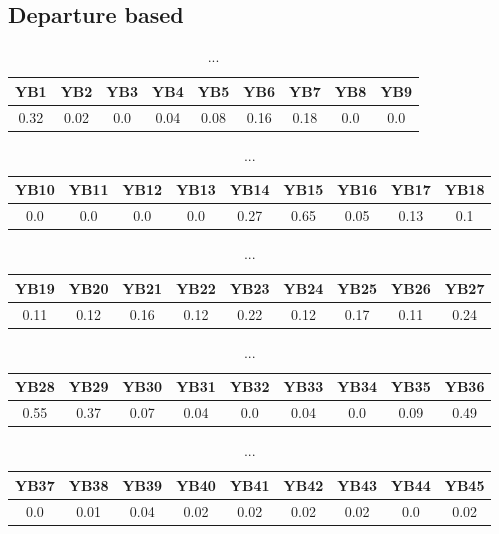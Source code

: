 \documentclass[]{article}
\begin{document}
\subsection{Departure based}
\begin{table}[h]
      \centering
      \begin{tabular}{|c|c|c|c|c|c|c|c|c|}
            \hline
            YB1  & YB2  & YB3 & YB4  & YB5  & YB6  & YB7  & YB8 & YB9 \\
            \hline
            0.32 & 0.02 & 0.0 & 0.04 & 0.08 & 0.16 & 0.18 & 0.0 & 0.0 \\
            \hline
      \end{tabular}
      \caption{...}
\end{table}
\begin{table}[h]
      \centering
      \begin{tabular}{|c|c|c|c|c|c|c|c|c|}
            \hline
            YB10 & YB11 & YB12 & YB13 & YB14 & YB15 & YB16 & YB17 & YB18 \\
            \hline
            0.0  & 0.0  & 0.0  & 0.0  & 0.27 & 0.65 & 0.05 & 0.13 & 0.1  \\
            \hline
      \end{tabular}
      \caption{...}
\end{table}
\begin{table}[h]
      \centering
      \begin{tabular}{|c|c|c|c|c|c|c|c|c|}
            \hline
            YB19 & YB20 & YB21 & YB22 & YB23 & YB24 & YB25 & YB26 & YB27 \\
            \hline
            0.11 & 0.12 & 0.16 & 0.12 & 0.22 & 0.12 & 0.17 & 0.11 & 0.24 \\
            \hline
      \end{tabular}
      \caption{...}
\end{table}
\begin{table}[h]
      \centering
      \begin{tabular}{|c|c|c|c|c|c|c|c|c|}
            \hline
            YB28 & YB29 & YB30 & YB31 & YB32 & YB33 & YB34 & YB35 & YB36 \\
            \hline
            0.55 & 0.37 & 0.07 & 0.04 & 0.0  & 0.04 & 0.0  & 0.09 & 0.49 \\
            \hline
      \end{tabular}
      \caption{...}
\end{table}
\begin{table}[h]
      \centering
      \begin{tabular}{|c|c|c|c|c|c|c|c|c|}
            \hline
            YB37 & YB38 & YB39 & YB40 & YB41 & YB42 & YB43 & YB44 & YB45 \\
            \hline
            0.0  & 0.01 & 0.04 & 0.02 & 0.02 & 0.02 & 0.02 & 0.0  & 0.02 \\
            \hline
      \end{tabular}
      \caption{...}
\end{table}
\end{document}
